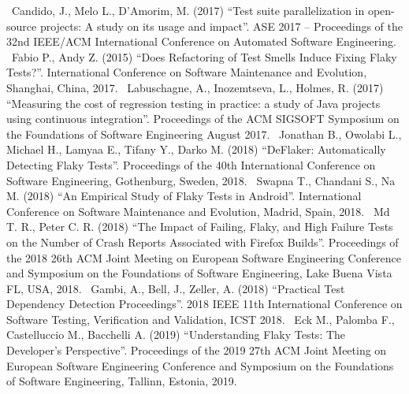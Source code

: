 \newline~\newline
[S9] Candido, J., Melo L., D’Amorim, M. (2017) “Test suite parallelization in open-source projects: A study on its usage and impact”. ASE 2017 – Proceedings
of the 32nd IEEE/ACM International Conference on Automated Software
Engineering.
\newline~\newline
[S10] Fabio P., Andy Z. (2015) “Does Refactoring of Test Smells Induce Fixing Flaky Tests?”. International Conference on Software Maintenance and
Evolution, Shanghai, China, 2017.
\newline~\newline
[S11] Labuschagne, A., Inozemtseva, L., Holmes, R. (2017) “Measuring
the cost of regression testing in practice: a study of Java projects using continuous integration”. Proceedings of the ACM SIGSOFT Symposium on the Foundations of Software Engineering August 2017.
\newline~\newline
[S12] Jonathan B., Owolabi L., Michael H., Lamyaa E., Tifany Y., Darko M. (2018) “DeFlaker: Automatically Detecting Flaky Tests”. Proceedings of the 40th International Conference on Software Engineering, Gothenburg, Sweden, 2018.
\newline~\newline
[S13] Swapna T., Chandani S., Na M. (2018) “An Empirical Study of Flaky Tests in Android”. International Conference on Software Maintenance and Evolution, Madrid, Spain, 2018.
\newline~\newline
[S14] Md T. R., Peter C. R. (2018) “The Impact of Failing, Flaky, and High Failure Tests on the Number of Crash Reports Associated with Firefox Builds”. Proceedings of the 2018 26th ACM Joint Meeting on European Software Engineering Conference and Symposium on the Foundations of Software Engineering, Lake Buena Vista FL, USA, 2018.
\newline~\newline
[S15] Gambi, A., Bell, J., Zeller, A. (2018) “Practical Test Dependency Detection Proceedings”. 2018 IEEE 11th International Conference on Software Testing, Verification and Validation, ICST 2018.
\newline~\newline
[S16] Eck M., Palomba F., Castelluccio M., Bacchelli A. (2019)
“Understanding Flaky Tests: The Developer’s Perspective”. Proceedings of the 2019 27th ACM Joint Meeting on European Software Engineering Conference and Symposium on the Foundations of Software Engineering, Tallinn, Estonia, 2019.
